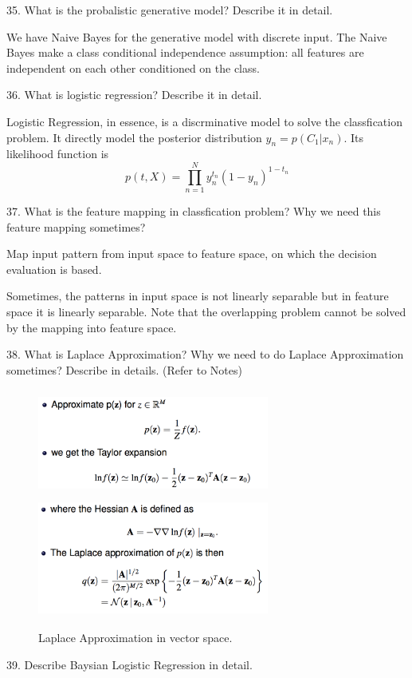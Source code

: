 \documentclass[11pt,a4paper]{article}
\begin{document}
35. What is the probalistic generative model? Describe it in detail.

    We have Naive Bayes for the generative model with discrete input. The Naive Bayes make a class conditional independence assumption: all features are independent on each other conditioned on the class.

36. What is logistic regression? Describe it in detail.

    Logistic Regression, in essence, is a discrminative model to solve the classfication problem. It directly model the posterior distribution $y_n = p(C_1 | x_n)$. Its likelihood function is 
    $$ p(t,X) = \prod_{n=1}^{N} y_{n}^{t_n} (1 - y_n) ^{1 - t_n} $$


37. What is the feature mapping in classfication problem? Why we need this feature mapping sometimes?

    Map input pattern from input space to feature space, on which the decision evaluation is based. 

    Sometimes, the patterns in input space is not linearly separable but in feature space it is linearly separable. Note that the overlapping problem cannot be solved by the mapping into feature space.

    38. What is Laplace Approximation? Why we need to do Laplace Approximation sometimes? Describe in details. (Refer to Notes)
{
    \begin{figure}[H] \centering
    \includegraphics[width=3in,height=1.4in]{./figure/Laplace_1.png}
    \includegraphics[width=3in,height=1.5in]{./figure/Laplace_2.png}
    \caption{Laplace Approximation in vector space.}
\end{figure}
}

39. Describe Baysian Logistic Regression in detail.
\end{document}
